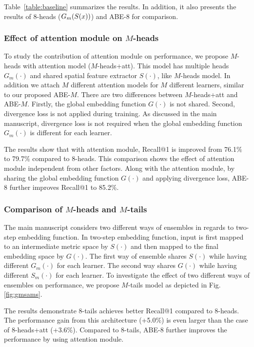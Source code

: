 \documentclass[runningheads]{llncs}
\begin{document}
Table~\ref{table:baseline} summarizes the results. In addition, it also presents the results of $8$-heads ($G_m(S(x))$) and ABE-$8$ for comparison.



\subsubsection{Effect of attention module on $M$-heads}
\label{sec:m-heads-att}

To study the contribution of attention module on performance, we propose
$M$-heads with attention model ($M$-heads+att). This model has multiple heads $G_m(\cdot)$
and shared spatial feature extractor $S(\cdot)$, like $M$-heads model. In addition we attach $M$
different attention models for $M$ different learners, similar to our proposed ABE-$M$.
There are two differences between $M$-heads+att and ABE-$M$. Firstly, the global
 embedding function $G(\cdot)$ is not shared. Second, divergence loss is not applied during
training. As discussed in the main manuscript, divergence loss is not required
when the global embedding function $G_m(\cdot)$ is different for each learner.

The results show that with attention module, Recall@1 is improved from
76.1$\%$ to 79.7$\%$ compared to $8$-heads. This comparison shows the effect of
attention module independent from other factors. Along with the attention module,
 by sharing the global embedding function $G(\cdot)$ and applying divergence loss, ABE-$8$
 further improves Recall@1 to 85.2$\%$.


\subsubsection{Comparison of $M$-heads and $M$-tails}
\label{sec:m-heads-tails}

The main manuscript considers two different ways of ensembles in regards
 to two-step embedding function. In two-step embedding function, input is first mapped
 to an intermediate metric space by $S(\cdot)$ and then mapped to the final embedding
space by $G(\cdot)$. The first way of ensemble shares $S(\cdot)$ while having different $G_m(\cdot)$
 for each learner. The second way shares $G(\cdot)$ while having
different $S_m(\cdot)$ for each learner. To investigate the effect of two different ways of
 ensembles on performance, we propose $M$-tails model as depicted in Fig. \ref{fig:gmsams}.

The results demonstrate $8$-tails achieves better Recall@1 compared to $8$-heads.
The performance gain from this architecture (+5.0$\%$) is even larger
than the case of $8$-heads+att (+3.6$\%$). Compared to $8$-tails, ABE-$8$
further improves the performance by using attention module.
 
\end{document}
